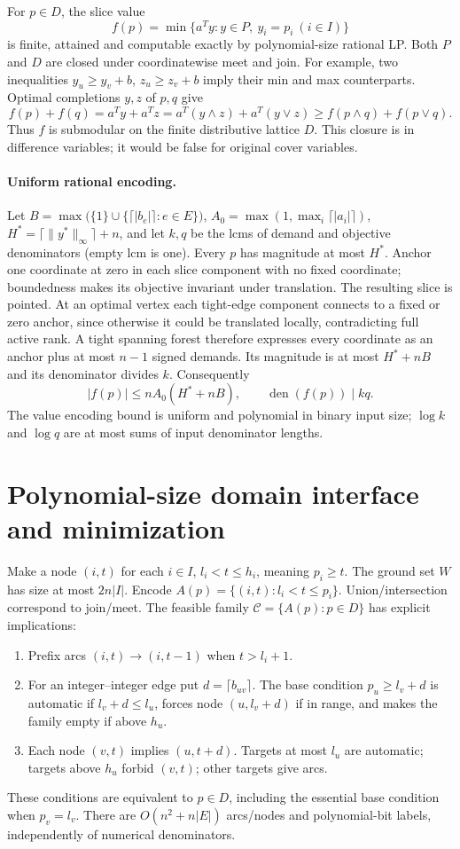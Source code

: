 \documentclass[11pt]{article}
\begin{document}
For $p\in D$, the slice value
\[
 f(p)=\min\{a^Ty:y\in P,\ y_i=p_i\ (i\in I)\}
\]
is finite, attained and computable exactly by polynomial-size rational LP.
Both $P$ and $D$ are closed under coordinatewise meet and join. For example,
two inequalities $y_u\ge y_v+b$, $z_u\ge z_v+b$ imply their min and max
counterparts. Optimal completions $y,z$ of $p,q$ give
\[
 f(p)+f(q)=a^Ty+a^Tz
 =a^T(y\wedge z)+a^T(y\vee z)
 \ge f(p\wedge q)+f(p\vee q).
\]
Thus $f$ is submodular on the finite distributive lattice $D$. This closure
is in difference variables; it would be false for original cover variables.

\paragraph{Uniform rational encoding.}
Let $B=\max\bigl(\{1\}\cup\{\lceil|b_e|\rceil:e\in E\}\bigr)$,
$A_0=\max(1,\max_i\lceil|a_i|\rceil)$,
$H^*=\lceil\|y^*\|_\infty\rceil+n$, and let $k,q$ be the lcms of demand and
objective denominators (empty lcm is one). Every $p$ has magnitude at most
$H^*$. Anchor one coordinate at zero in each slice component with no fixed
coordinate; boundedness makes its objective invariant under translation.
The resulting slice is pointed. At an optimal vertex each tight-edge
component connects to a fixed or zero anchor, since otherwise it could be
translated locally, contradicting full active rank. A tight spanning forest
therefore expresses every coordinate as an anchor plus at most $n-1$ signed
demands. Its magnitude is at most $H^*+nB$ and its denominator divides $k$.
Consequently
\[
 |f(p)|\le nA_0(H^*+nB),\qquad \operatorname{den}(f(p))\mid kq.
\]
The value encoding bound is uniform and polynomial in binary input size;
$\log k$ and $\log q$ are at most sums of input denominator lengths.

\section{Polynomial-size domain interface and minimization}
Make a node $(i,t)$ for each $i\in I$, $l_i<t\le h_i$, meaning $p_i\ge t$.
The ground set $W$ has size at most $2n|I|$. Encode
$A(p)=\{(i,t):l_i<t\le p_i\}$. Union/intersection correspond to join/meet.
The feasible family $\mathcal C=\{A(p):p\in D\}$ has explicit implications:
\begin{enumerate}
\item Prefix arcs $(i,t)\to(i,t-1)$ when $t>l_i+1$.
\item For an integer--integer edge put $d=\lceil b_{uv}\rceil$. The base
condition $p_u\ge l_v+d$ is automatic if $l_v+d\le l_u$, forces node
$(u,l_v+d)$ if in range, and makes the family empty if above $h_u$.
\item Each node $(v,t)$ implies $(u,t+d)$. Targets at most $l_u$ are automatic;
targets above $h_u$ forbid $(v,t)$; other targets give arcs.
\end{enumerate}
These conditions are equivalent to $p\in D$, including the essential base
condition when $p_v=l_v$. There are $O(n^2+n|E|)$ arcs/nodes and polynomial-bit
labels, independently of numerical denominators.
\end{document}
